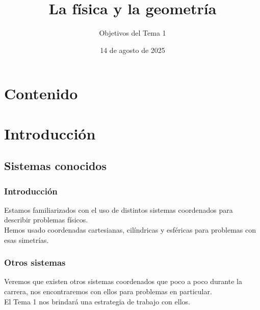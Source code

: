 \documentclass[12pt]{beamer}
\date{14 de agosto de 2025}
\title{La física y la geometría}
\subtitle{Objetivos del Tema 1}
\begin{document}
\maketitle
\fontsize{14}{14}\selectfont
{}

\section*{Contenido}

\section{Introducción}
\subsection{Sistemas conocidos}

\begin{frame}
\frametitle{Introducción}
Estamos familiarizados con el uso de distintos sistemas coordenados para describir problemas físicos.
\\
\bigskip
\pause
Hemos usado coordenadas cartesianas, cilíndricas y esféricas para problemas con esas simetrías.
\end{frame}
\begin{frame}
\frametitle{Otros sistemas}
Veremos que existen otros sistemas coordenados que poco a poco durante la carrera, nos encontraremos con ellos para problemas en particular.
\\
\bigskip
\pause
El Tema 1 nos brindará una estrategia de trabajo con ellos.
\end{frame}

\end{document}

